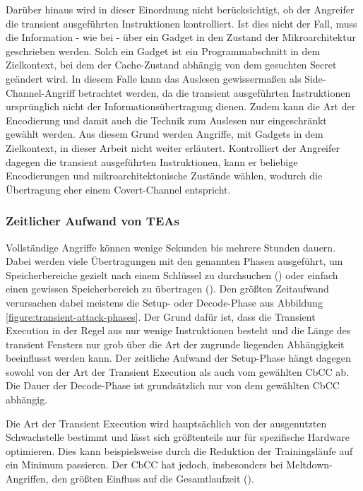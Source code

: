 Darüber hinaus wird in dieser Einordnung nicht berücksichtigt,
ob der Angreifer die transient
ausgeführten Instruktionen kontrolliert. Ist dies nicht der Fall,
muss die Information - wie bei \cite[8]{kocher_spectre_2019} - über
ein Gadget in den Zustand der Mikroarchitektur geschrieben werden.
Solch ein Gadget ist ein Programmabschnitt in dem Zielkontext,
bei dem der Cache-Zustand abhängig von dem gesuchten Secret
geändert wird. In diesem Falle kann das Auslesen
gewissermaßen als Side-Channel-Angriff betrachtet werden, da
die transient ausgeführten Instruktionen ursprünglich nicht der
Informationsübertragung dienen. Zudem kann die
Art der Encodierung und damit auch die Technik zum Auslesen nur
eingeschränkt gewählt werden. Aus diesem Grund werden Angriffe,
mit Gadgets in dem Zielkontext, in dieser Arbeit nicht weiter
erläutert. Kontrolliert der Angreifer dagegen
die transient ausgeführten Instruktionen, kann er beliebige
Encodierungen und mikroarchitektonische Zustände wählen, wodurch
die Übertragung eher einem Covert-Channel entspricht.

\subsubsection{Zeitlicher Aufwand von \acp{TEA}}
Vollständige Angriffe können wenige Sekunden bis mehrere Stunden
dauern. Dabei werden viele Übertragungen mit den genannten Phasen
ausgeführt, um Speicherbereiche gezielt nach einem Schlüssel zu
durchsuchen (\cite[7-9]{hertogh_rain_nodate}) oder einfach einen
gewissen Speicherbereich zu übertragen (\cite[10]{kim_slap_2025}).
Den größten Zeitaufwand verursachen dabei meistens die Setup-
oder Decode-Phase aus Abbildung \ref{figure:transient-attack-phases}.
Der Grund dafür ist, dass die Transient Execution in der Regel
aus nur wenige Instruktionen besteht und die
Länge des transient Fensters nur grob über die Art der zugrunde
liegenden Abhängigkeit beeinflusst werden kann. Der zeitliche
Aufwand der Setup-Phase hängt dagegen sowohl von der Art der
Transient Execution als auch vom gewählten \ac{CbCC} ab.
Die Dauer der Decode-Phase ist grundsätzlich nur von dem gewählten
\ac{CbCC} abhängig.

Die Art der Transient Execution wird hauptsächlich von der
ausgenutzten Schwachstelle bestimmt und lässt sich größtenteils nur
für spezifische Hardware optimieren. Dies kann beispielsweise durch
die Reduktion der Trainingsläufe auf ein Minimum passieren.
Der \ac{CbCC} hat jedoch, insbesonders bei Meltdown-Angriffen, den
größten Einfluss auf die Gesamtlaufzeit (\cite[10]{lipp_meltdown_2020}).

